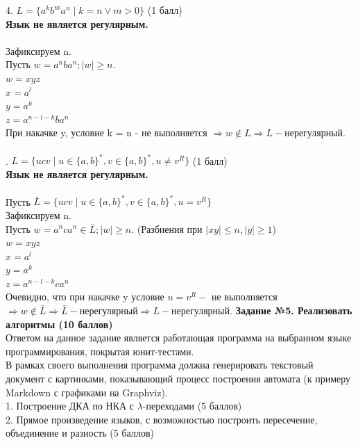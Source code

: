 \documentclass{article}
\begin{document}
4. \(L = \{a^kb^ma^n \mid k = n \lor m > 0 \}\) (1 балл)\\
\hfill \break
\normalsize \textbf{Язык не является регулярным.}\\\\
Зафиксируем n.\\
Пусть \( w = a^nba^n; |w| \geq n.\)\\
 \(w = xyz\)\\
 \( x = a^l\)\\
 \( y = a^k\)\\
 \( z = a^{n-l-k}ba^n\)\\
{При накачке y, условие k = n - не выполняется} \(\Rightarrow w \notin L \Rightarrow L - \text{нерегулярный.}\)\\\\
\hfill {}. \(L = \{ucv \mid u \in \{a,b\}^*, v \in \{a,b\}^*, u \neq v^R\}\) (1 балл)\\
\hfill \break
\normalsize \textbf{Язык не является регулярным.}\\\\
Пусть \( \bar{L} =  \{ucv \mid u \in \{a,b\}^*, v \in \{a,b\}^*, u = v^R\}\)\\
Зафиксируем n.\\
Пусть \( w = a^nca^{n} \in  \bar{L}; |w| \geq n.\) (Разбиения при \(|xy| \leq n, |y| \geq 1\))\\
 \(w = xyz\)\\
 \( x = a^l\)\\
 \( y = a^k\)\\
 \( z = a^{n-l-k}ca^{n}\)\\
Очевидно, что при накачке y условие \( u = v^R - \) не выполняется \(\Rightarrow w \notin \bar{L} \Rightarrow \bar{L} - \text{нерегулярный} \Rightarrow L - \text{нерегулярный.}\)
\newpage
\textbf{\Large Задание №5. Реализовать алгоритмы (10 баллов)}\\
\hfill \break
\normalsize{Ответом на данное задание является работающая программа на выбранном
языке программирования, покрытая юнит-тестами.}\\
\hfill \break
\normalsize{В рамках своего выполнения программа должна генерировать текстовый
документ с картинками, показывающий процесс построения автомата (к
примеру Markdown с графиками на Graphviz).}\\
\hfill \break
\normalsize{ 1. Построение ДКА по НКА с \(\lambda\)-переходами } (5 баллов)\\
\hfill \break
\normalsize{2. Прямое произведение языков, с возможностью построить пересечение,
объединение и разность} (5 баллов)\\
\hfill \break
\end{document}
